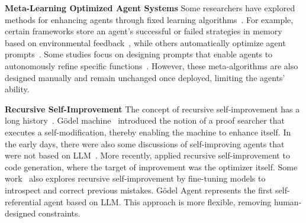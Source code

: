 \documentclass[11pt]{article}
\newcommand{\godel}{G\"odel\xspace}
\newcommand{\framework}{Gödel Agent\xspace}
\begin{document}
\noindent\textbf{Meta-Learning Optimized Agent Systems} \quad
Some researchers have explored methods for enhancing agents through fixed learning algorithms~\citep{zhou2024symbolic,hu2024automated}. For example, certain frameworks store an agent’s successful or failed strategies in memory based on environmental feedback~\citep{liu2023think,hu2023chatdb,qian2024investigateconsolidateexploitgeneralstrategyintertask}, while others automatically optimize agent prompts~\citep{khattab2023dspy,zhang2024agent,khattab2023dspy}. Some studies focus on designing prompts that enable agents to autonomously refine specific functions~\citep{zhangoffline}. 
However, these meta-algorithms are also designed manually and remain unchanged once deployed, limiting the agents' ability.

\noindent\textbf{Recursive Self-Improvement} \quad
The concept of recursive self-improvement has a long history~\citep{good1966speculations,schmidhuber1987evolutionary}.  \godel machine~\citep{schmidhuber2003godel} introduced the notion of a proof searcher that executes a self-modification, thereby enabling the machine to enhance itself.
In the early days, there were also some discussions of self-improving agents that were not based on LLM~\citep{hall2007self,steunebrink2012towards}.
More recently, \citet{zelikman2023self} applied recursive self-improvement to code generation, where the target of improvement was the optimizer itself.
Some work~\citep{havrilla2024glorewhenwhereimprove,qu2024recursiveintrospectionteachinglanguage,kumar2024traininglanguagemodelsselfcorrect} also explores recursive self-improvement by fine-tuning models to introspect and correct previous mistakes.
\framework represents the first self-referential agent based on LLM. This approach is more flexible, removing human-designed constraints.
\end{document}
